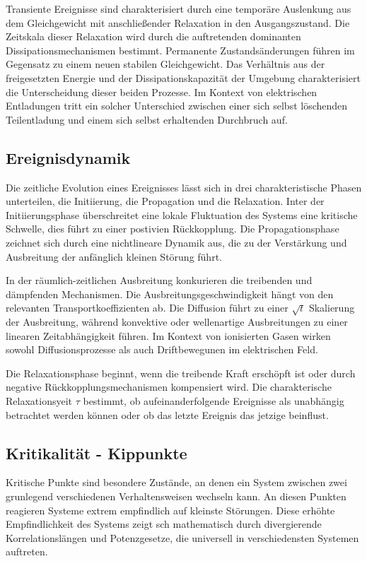 Transiente Ereignisse sind charakterisiert durch eine temporäre Auslenkung aus dem Gleichgewicht mit anschließender Relaxation in den Ausgangszustand. Die Zeitskala dieser Relaxation wird durch die auftretenden dominanten Dissipationsmechanismen bestimmt. Permanente Zustandsänderungen führen im Gegensatz zu einem neuen stabilen Gleichgewicht. Das Verhältnis aus der freigesetzten Energie und der Dissipationskapazität der Umgebung charakterisiert die Unterscheidung dieser beiden Prozesse. Im Kontext von elektrischen Entladungen tritt ein solcher Unterschied zwischen einer sich selbst löschenden Teilentladung und einem sich selbst erhaltenden Durchbruch auf.

\subsection{Ereignisdynamik}
Die zeitliche Evolution eines Ereignisses lässt sich in drei charakteristische Phasen unterteilen, die Initiierung, die Propagation und die Relaxation. Inter der Initiierungsphase überschreitet eine lokale Fluktuation des Systems eine kritische Schwelle, dies führt zu einer postivien Rückkopplung. Die Propagationsphase zeichnet sich durch eine nichtlineare Dynamik aus, die zu der Verstärkung und Ausbreitung der anfänglich kleinen Störung führt.

In der räumlich-zeitlichen Ausbreitung konkurieren die treibenden und dämpfenden Mechanismen. Die Ausbreitungsgeschwindigkeit hängt von den relevanten Transportkoeffizienten ab. Die Diffusion führt zu einer \(\sqrt{t}\) Skalierung der Ausbreitung, während konvektive oder wellenartige Ausbreitungen zu einer linearen Zeitabhängigkeit führen. Im Kontext von ionisierten Gasen wirken sowohl Diffusionsprozesse als auch Driftbewegunen im elektrischen Feld. 

Die Relaxationsphase beginnt, wenn die treibende Kraft erschöpft ist oder durch negative Rückkopplungsmechanismen kompensiert wird. Die charakterische Relaxationsyeit \(\tau\) bestimmt, ob aufeinanderfolgende Ereignisse als unabhängig betrachtet werden können oder ob das letzte Ereignis das jetzige beinflust.

\subsection{Kritikalität - Kippunkte}
Kritische Punkte sind besondere Zustände, an denen ein System zwischen zwei grunlegend verschiedenen Verhaltensweisen wechseln kann. An diesen Punkten reagieren Systeme extrem empfindlich auf kleinste Störungen. Diese erhöhte Empfindlichkeit des Systems zeigt sch mathematisch durch divergierende Korrelationslängen und Potenzgesetze, die universell in verschiedensten Systemen auftreten. 

